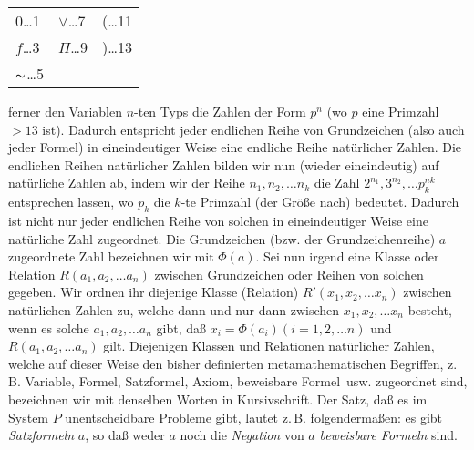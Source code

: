 \documentclass[draft]{scrartcl}
\begin{document}
\label{grundzeichenzahlen}
\begin{center}
\begin{tabular}{lll}
	\glqq$0$\grqq\dots 1 & \glqq$\lor$\grqq\dots 7 & \glqq(\grqq\dots 11 \\
	\glqq$f$\grqq\dots 3 & \glqq$\Pi$\grqq\dots 9 & \glqq)\grqq\dots 13\\
	\glqq$\thicksim$\grqq\dots 5 & &
\end{tabular}
\end{center}

\noindent ferner den Variablen $n$-ten Typs die Zahlen der
Form $p^n$ (wo $p$ eine Primzahl $> 13$ ist). Dadurch
entspricht jeder endlichen Reihe von Grundzeichen (also
auch jeder Formel) in eineindeutiger Weise
eine endliche Reihe natürlicher Zahlen. Die endlichen
Reihen natürlicher Zahlen bilden wir nun (wieder eineindeutig)
auf natürliche Zahlen ab, indem wir der Reihe
$n_1, n_2, \dots n_k$ die Zahl
$2^{n_1}, 3^{n_2}, \dots p_k^{nk}$
entsprechen lassen, wo $p_k$ die $k$-te
Primzahl (der Größe nach) bedeutet. Dadurch ist nicht nur
jeder endlichen Reihe von solchen in eineindeutiger Weise
eine natürliche Zahl zugeordnet. Die Grundzeichen (bzw.
der Grundzeichenreihe) $a$ zugeordnete Zahl bezeichnen
wir mit $\Phi\left(a\right)$. Sei nun irgend eine Klasse oder
Relation $R\left(a_1, a_2, \dots a_n\right)$ zwischen Grundzeichen
oder Reihen von solchen gegeben. Wir ordnen ihr diejenige
Klasse (Relation) $R'\left(x_1, x_2, \dots x_n\right)$ zwischen
natürlichen Zahlen zu, welche dann und nur dann zwischen
$x_1, x_2, \dots x_n$ besteht, wenn es solche
$a_1, a_2, \dots a_n$ gibt, daß $x_i = \Phi\left(a_i\right) \left(i = 1, 2, \dots n\right)$ und
$R\left(a_1, a_2, \dots a_n\right)$ gilt. Diejenigen
Klassen und Relationen natürlicher Zahlen, welche
auf dieser Weise den bisher definierten
metamathematischen Begriffen, z.\,B. \glqq Variable\grqq,
\glqq Formel\grqq, \glqq Satzformel\grqq, \glqq Axiom\grqq,
\glqq beweisbare Formel\grqq\ usw. zugeordnet sind,
bezeichnen wir mit denselben Worten in Kursivschrift. Der
Satz, daß es im System $P$ unentscheidbare Probleme gibt,
lautet z.\,B. folgendermaßen: es gibt \textit{Satzformeln} $a$,
so daß weder $a$ noch die \textit{Negation} von $a$
\textit{beweisbare Formeln} sind.
\end{document}
